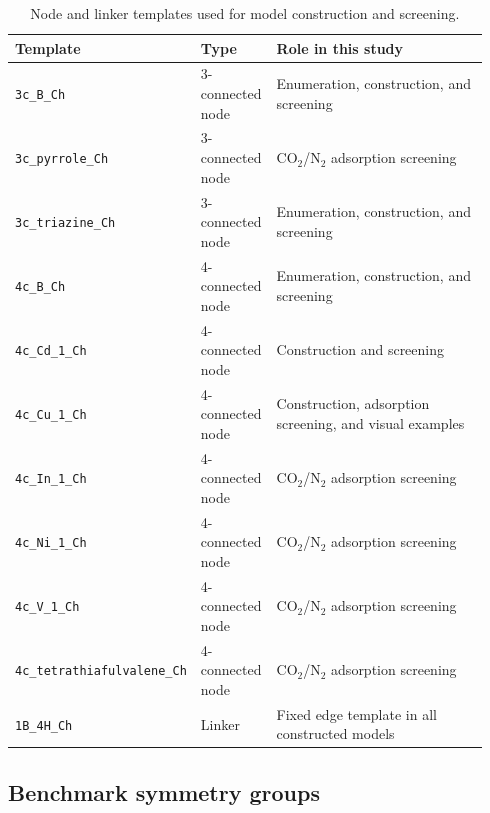 \documentclass[a5paper, 10pt]{article}
\begin{document}
\begin{table}[H]
\centering
\scriptsize
\setlength{\tabcolsep}{1.2mm}
\renewcommand{\arraystretch}{1.15}
\caption{Node and linker templates used for model construction and screening.}
\label{tab:building_units}
\begin{tabular}{@{}p{0.32\linewidth}p{0.16\linewidth}p{0.46\linewidth}@{}}
\toprule
\textbf{Template} & \textbf{Type} & \textbf{Role in this study} \\
\midrule
\texttt{3c\_B\_Ch} & 3-connected node & Enumeration, construction, and screening \\
\texttt{3c\_pyrrole\_Ch} & 3-connected node & CO$_2$/N$_2$ adsorption screening \\
\texttt{3c\_triazine\_Ch} & 3-connected node & Enumeration, construction, and screening \\
\texttt{4c\_B\_Ch} & 4-connected node & Enumeration, construction, and screening \\
\texttt{4c\_Cd\_1\_Ch} & 4-connected node & Construction and screening \\
\texttt{4c\_Cu\_1\_Ch} & 4-connected node & Construction, adsorption screening, and visual examples \\
\texttt{4c\_In\_1\_Ch} & 4-connected node & CO$_2$/N$_2$ adsorption screening \\
\texttt{4c\_Ni\_1\_Ch} & 4-connected node & CO$_2$/N$_2$ adsorption screening \\
\texttt{4c\_V\_1\_Ch} & 4-connected node & CO$_2$/N$_2$ adsorption screening \\
\texttt{4c\_tetrathiafulvalene\_Ch} & 4-connected node & CO$_2$/N$_2$ adsorption screening \\
\texttt{1B\_4H\_Ch} & Linker & Fixed edge template in all constructed models \\
\bottomrule
\end{tabular}
\end{table}

\subsection{Benchmark symmetry groups}
\label{app:benchmark_symmetry}
\end{document}
